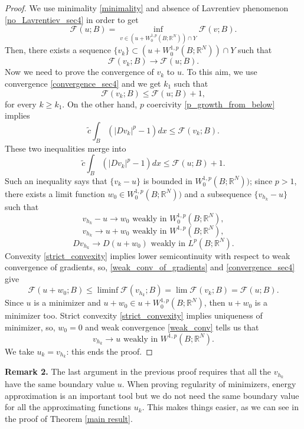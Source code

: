 \documentclass[a4paper,10pt]{article}
\theoremstyle{plain}
\theoremstyle{definition}
\numberwithin{equation}{section} \makeatletter
\begin{document}
\begin{proof}

\noindent
We use minimality \eqref{minimality} and absence of Lavrentiev phenomenon \eqref{no_Lavrentiev_sec4} in order to get 
$$
\mathcal{F}(u;B) = \inf_{v \in (u + W^{1,p}_0(B;\mathbb{R}^N)) \cap Y} \mathcal{F}(v;B).
$$
Then, there exists a sequence  $\{v_k\} \subset (u + W^{1,p}_0(B;\mathbb{R}^N)) \cap Y$ such that 
\begin{equation}
\label{convergence_sec4}
\mathcal{F}(v_k;B) \to \mathcal{F}(u;B).
\end{equation}
Now we need to prove the convergence of $v_k$ to $u$. To this aim, we use  
convergence \eqref{convergence_sec4} and we get $k_1$ such that
$$
 \mathcal{F}(v_k;B) \leq  \mathcal{F}(u;B) + 1,
$$
for every $k \geq k_1$. On the other hand, 
$p$ coercivity \eqref{p_growth_from_below} implies
$$
\tilde{c} \int_B (|Dv_k|^p - 1) dx \leq \mathcal{F}(v_k;B).
$$
These two inequalities merge into
$$
\tilde{c} \int_B (|Dv_k|^p - 1) dx \leq \mathcal{F}(u;B) + 1.
$$
Such an inequality says that $\{v_k - u \}$ is bounded in $W^{1,p}_0(B;\mathbb{R}^N))$; since $p>1$, there exists a limit function $w_0 \in W^{1,p}_0(B;\mathbb{R}^N))$ and a subsequence 
$\{v_{h_k} - u \}$ such that
$$
v_{h_k} - u \to w_0 \text{ weakly in } W^{1,p}_0(B;\mathbb{R}^N),
$$
\begin{equation}
\label{weak_conv}
v_{h_k}  \to u + w_0 \text{ weakly in } W^{1,p}(B;\mathbb{R}^N),
\end{equation}
\begin{equation}
\label{weak_conv_of_gradients}
Dv_{h_k}  \to D(u + w_0) \text{ weakly in } L^{p}(B;\mathbb{R}^N).
\end{equation}
Convexity \eqref{strict_convexity} implies lower semicontinuity with respect to weak convergence of gradients, so, \eqref{weak_conv_of_gradients} and \eqref{convergence_sec4} give
$$
\mathcal{F}(u + w_0;B) \leq \liminf \mathcal{F}(v_{h_k};B) 
= \lim \mathcal{F}(v_{k};B) = \mathcal{F}(u;B).
$$
Since $u$ is a minimizer and $u + w_0 \in u + W^{1,p}_0(B;\mathbb{R}^N)$, then $u + w_0$ is a minimizer too. Strict convexity \eqref{strict_convexity} implies uniqueness of minimizer, so, $w_0 = 0$ and weak convergence \eqref{weak_conv} tells us that
$$
v_{h_k}  \to u  \text{ weakly in } W^{1,p}(B;\mathbb{R}^N).
$$
We take $u_k = v_{h_k}$: this ends the proof.
\end{proof}

\noindent
\textbf{Remark 2.}
The last argument in the previous proof requires that all the $v_{h_k}$ have the same boundary value $u$.
When proving regularity of minimizers, energy approximation is an important tool but we do not need the same boundary value for all the approximating functions $u_k$. This makes things easier, as we can see in the proof of Theorem \ref{main result}.
\end{document}

